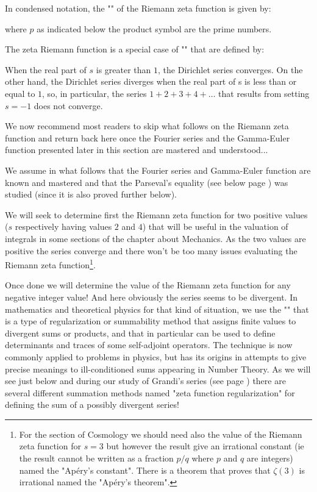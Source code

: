	In condensed notation, the "" of the Riemann zeta function is given by:
	
	where $p$ as indicated below the product symbol are the prime numbers.
	\begin{tcolorbox}[title=Remark,colframe=black,arc=10pt]
	The zeta Riemann function is a special case of "" that are defined by:
	
	When the real part of $s$ is greater than $1$, the Dirichlet series converges. On the other hand, the Dirichlet series diverges when the real part of s is less than or equal to $1$, so, in particular, the series $1 + 2 + 3 + 4 + \ldots$ that results from setting $s=-1$ does not converge.
	\end{tcolorbox}
	We now recommend most readers to skip what follows on the Riemann zeta function and return back here once the Fourier series and the Gamma-Euler function presented later in this section are mastered and understood...
	
	We assume in what follows that the Fourier series and Gamma-Euler function are known and mastered and that the Parseval's equality (see below page \pageref{Parseval theorem}) was studied (since it is also proved further below). 
	
	We will seek to determine first the Riemann zeta function for two positive values ($s$ respectively having values $2$ and $4$) that will be useful in the valuation of integrals in some sections of the chapter about Mechanics. As the two values are positive the series converge and there won't be too many issues evaluating the Riemann zeta function\footnote{For the section of Cosmology we should need also the value of the Riemann zeta function for $s=3$ but however the result give an irrational constant (ie the result cannot be written as a fraction $p/q$ where $p$ and $q$ are integers) named the "Apéry's constant". There is a theorem that proves that $\zeta(3)$ is irrational named the "Apéry's theorem".}. 
	
	Once done we will determine the value of the Riemann zeta function for any negative integer value! And here obviously the series seems to be divergent. In mathematics and theoretical physics for that kind of situation, we use the "\label{zeta riemann regularization}" that is a type of regularization or summability method that assigns finite values to divergent sums or products, and that in particular can be used to define determinants and traces of some self-adjoint operators. The technique is now commonly applied to problems in physics, but has its origins in attempts to give precise meanings to ill-conditioned sums appearing in Number Theory. As we will see just below and during our study of Grandi's series (see page \pageref{Grandi series}) there are several different summation methods named "zeta function regularization" for defining the sum of a possibly divergent series!
	

